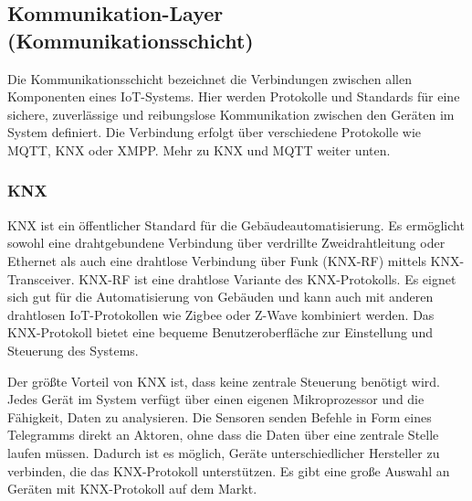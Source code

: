 \documentclass[12pt, a4paper]{article}
\begin{document}
\subsection{Kommunikation-Layer (Kommunikationsschicht)}
\par Die Kommunikationsschicht bezeichnet die Verbindungen zwischen allen Komponenten eines IoT-Systems. Hier werden Protokolle und Standards für eine sichere, zuverlässige und reibungslose Kommunikation zwischen den Geräten im System definiert. Die Verbindung erfolgt über verschiedene Protokolle wie MQTT, KNX oder XMPP. Mehr zu KNX und MQTT weiter unten.
\subsubsection{KNX}
\par KNX ist ein öffentlicher Standard für die Gebäudeautomatisierung. Es ermöglicht sowohl eine drahtgebundene Verbindung über verdrillte Zweidrahtleitung oder Ethernet als auch eine drahtlose Verbindung über Funk (KNX-RF) mittels KNX-Transceiver. KNX-RF ist eine drahtlose Variante des KNX-Protokolls. Es eignet sich gut für die Automatisierung von Gebäuden und kann auch mit anderen drahtlosen IoT-Protokollen wie Zigbee oder Z-Wave kombiniert werden. Das KNX-Protokoll bietet eine bequeme Benutzeroberfläche zur Einstellung und Steuerung des Systems.
\par Der größte Vorteil von KNX ist, dass keine zentrale Steuerung benötigt wird. Jedes Gerät im System verfügt über einen eigenen Mikroprozessor und die Fähigkeit, Daten zu analysieren. Die Sensoren senden Befehle in Form eines Telegramms direkt an Aktoren, ohne dass die Daten über eine zentrale Stelle laufen müssen. Dadurch ist es möglich, Geräte unterschiedlicher Hersteller zu verbinden, die das KNX-Protokoll unterstützen. Es gibt eine große Auswahl an Geräten mit KNX-Protokoll auf dem Markt.
\end{document}
